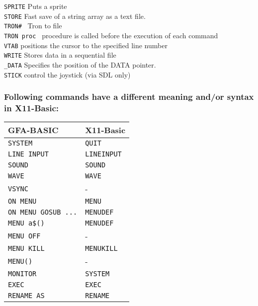 \begin{tabbing}
\verb|SPRITE|\> 	      Puts a sprite\\
\verb|STORE|\>  	      Fast save of a string array as a text file.\\
\verb|TRON# |\> 	      Tron to file\\
\verb|TRON proc |\>    procedure is called  before  the execution of each command\\
\verb|VTAB|\>         positions the cursor to the specified line number\\
\verb|WRITE|\>  	      Stores data in a sequential file\\
\verb|_DATA|\>	       	Specifies the position of the DATA pointer.\\
\verb|STICK|\>		control the joystick (via SDL only)\\
\end{tabbing}

\subsubsection*{Following commands have a different meaning and/or syntax in X11-Basic:}


\begin{center}\begin{tabular}{|ll|}
\hline
{\bf GFA-BASIC }        & {\bf X11-Basic}\\
\hline
\verb|SYSTEM|           & \verb|QUIT|\\
\verb|LINE INPUT|       & \verb|LINEINPUT|\\
\verb|SOUND|		& \verb|SOUND|\\
\verb|WAVE|		& \verb|WAVE|\\
\verb|VSYNC|            &  -\\
\verb|ON MENU|		& \verb|MENU|\\
\verb|ON MENU GOSUB ...|& \verb|MENUDEF|\\
\verb|MENU a$()|        & \verb|MENUDEF|\\
\verb|MENU OFF|         &  -\\
\verb|MENU KILL|        & \verb|MENUKILL|\\
\verb|MENU()|           &  -\\
\verb|MONITOR|          & \verb|SYSTEM|\\
\verb|EXEC|             & \verb|EXEC|\\
\verb|RENAME AS|        & \verb|RENAME|\\
\hline
\end{tabular}\end{center}

